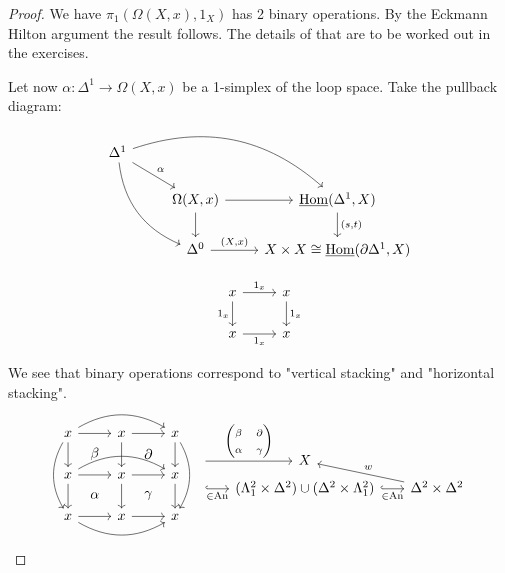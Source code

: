 \begin{proof}
    We have $\pi_1(\Omega(X,x),1_X)$ has 2 binary operations.
    By the Eckmann Hilton argument the result follows.
    The details of that are to be worked out in the exercises.

Let now $\alpha\colon \Delta^1 \to \Omega(X,x) $ be a 1-simplex of the loop space.
Take the pullback diagram:
\[
\begin{tikzcd}
    \Delta^1
    \ar[rd,"\alpha"]
    \ar[rrd, bend left]
    \ar[rdd, bend right]
    &&
    \\
    &
    \Omega(X,x)
    \rar
    \dar
    &
    \underline{\Hom}(\Delta^1,X)
    \ar[d, "{(s,t)}"]
    \\
    &
    \Delta^0
    \ar[r, "{(X,x)}"]
    &
    X \times X \cong \underline{\Hom}(\partial \Delta^1, X)
\end{tikzcd}
\]

\[
    \begin{tikzcd}
        x
        \ar[d,"1_x"']
        \ar[r,"1_x"]
        &
        x
        \ar[d,"1_x"]
        \\
        x
        \ar[r,"1_x"']
        &
        x
    \end{tikzcd}
\]

We see that binary operations correspond to "vertical stacking" and "horizontal stacking".
\[
\begin{tikzcd}
    x
    \ar[r]
    \ar[d]
    \ar[r, phantom, shift right =3.4ex, "\beta" ]
    \ar[rr, bend left]
    \ar[dd, bend right]
    &
    x
    \ar[r]
    \ar[d]
    \ar[r, phantom, shift right =3.4ex, "\partial" ]
    &
    x
    \dar
    \ar[dd, bend left]
    \\
    x
    \ar[r]
    \ar[d]
    \ar[r, phantom, shift right =3.4ex, "\alpha" ]
    \ar[rr, bend left]
    &
    x
    \ar[r]
    \ar[d]
    \ar[r, phantom, shift right =3.4ex, "\gamma" ]
    &
    x
    \dar
    \\
    x
    \rar
    \ar[rr,bend right]
    &
    x
    \rar
    &
    x
\end{tikzcd}
\begin{tikzcd}[column sep=4ex,row sep=1ex, ampersand replacement=\&]
    \ar[r, "{\begin{pmatrix}
        \beta  & \partial \\
        \alpha & \gamma
        \end{pmatrix}}"]
    \&
    X
    \&
    \\
    \ar[r, hook, "{\in \An}"']
    \&
    (\Lambda_1^2 \times \Delta^2) \cup ( \Delta^2 \times \Lambda_1^2)
    \ar[r, hook, "{\in \An}"']
    \&
    \Delta^2 \times \Delta^2
    \ar[lu, "w"']
\end{tikzcd}
\]



\end{proof}

